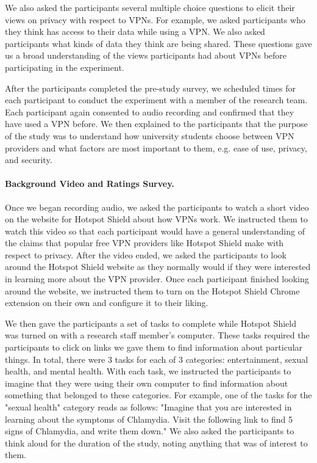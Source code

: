 We also asked the participants several multiple choice questions to elicit
their views on privacy with respect to VPNs.  For example, we asked
participants who they think has access to their data while using a VPN.  We
also asked participants what kinds of data they think are being shared.  These
questions gave us a broad understanding of the views participants had about
VPNs before participating in the experiment.

After the participants completed the pre-study survey, we scheduled times for
each participant to conduct the experiment with a member of the research team.
Each participant again consented to audio recording and confirmed that they
have used a VPN before.  We then explained to the participants that the
purpose of the study was to understand how university students choose between
VPN providers and what factors are most important to them, e.g. ease of use,
privacy, and security.

\paragraph{Background Video and Ratings Survey.}
Once we began recording audio, we asked the participants to watch a short
video on the website for Hotspot Shield about how VPNs work.  We instructed
them to watch this video so that each participant would have a general
understanding of the claims that popular free VPN providers like Hotspot
Shield make with respect to privacy.  After the video ended, we asked the
participants to look around the Hotspot Shield website as they normally would
if they were interested in learning more about the VPN provider.  Once each
participant finished looking around the website, we instructed them to turn on
the Hotspot Shield Chrome extension on their own and configure it to their
liking.

We then gave the participants a set of tasks to complete while Hotspot Shield
was turned on with a research staff member's computer.  These tasks required
the participants to click on links we gave them to find information about
particular things.  In total, there were 3 tasks for each of 3 categories:
entertainment, sexual health, and mental health.  With each task, we
instructed the participants to imagine that they were using their own computer
to find information about something that belonged to these categories.  For
example, one of the tasks for the "sexual health" category reads as follows:
"Imagine that you are interested in learning about the symptoms of Chlamydia.
Visit the following link to find 5 signs of Chlamydia, and write them down."
We also asked the participants to think aloud for the duration of the study,
noting anything that was of interest to them.  

